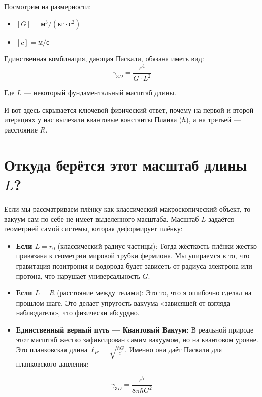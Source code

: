 \documentclass[12pt,a4paper]{article}
\begin{document}
Посмотрим на размерности:
\begin{itemize}
    \item $[G] = \text{м}^3 / (\text{кг} \cdot \text{с}^2)$
    \item $[c] = \text{м} / \text{с}$
\end{itemize}

Единственная комбинация, дающая Паскали, обязана иметь вид:
\begin{equation}
\gamma_{3D} = \frac{c^4}{G \cdot L^2}
\end{equation}

Где $L$ — некоторый фундаментальный масштаб длины.

И вот здесь скрывается ключевой физический ответ, почему на первой и второй итерациях у нас вылезали квантовые константы Планка ($\hbar$), а на третьей — расстояние $R$.

\section*{Откуда берётся этот масштаб длины $L$?}

Если мы рассматриваем плёнку как классический макроскопический объект, то вакуум сам по себе не имеет выделенного масштаба. Масштаб $L$ задаётся геометрией самой системы, которая деформирует плёнку:

\begin{itemize}
    \item \textbf{Если $L = r_0$} (классический радиус частицы): Тогда жёсткость плёнки жестко привязана к геометрии мировой трубки фермиона. Мы упираемся в то, что гравитация позитрония и водорода будет зависеть от радиуса электрона или протона, что нарушает универсальность $G$.
    \item \textbf{Если $L = R$} (расстояние между телами): Это то, что я ошибочно сделал на прошлом шаге. Это делает упругость вакуума «зависящей от взгляда наблюдателя», что физически абсурдно.
    \item \textbf{Единственный верный путь — Квантовый Вакуум:} В реальной природе этот масштаб жестко зафиксирован самим вакуумом, но на квантовом уровне. Это планковская длина $\ell_P = \sqrt{\frac{\hbar G}{c^3}}$. Именно она даёт Паскали для планковского давления:
\end{itemize}

\begin{equation}
\gamma_{3D} = \frac{c^7}{8\pi \hbar G^2}
\end{equation}
\end{document}
